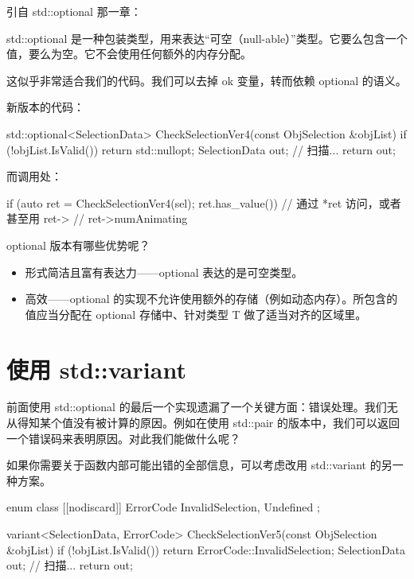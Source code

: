 引自 std::optional 那一章：

std::optional 是一种包装类型，用来表达“可空（null-able）”类型。它要么包含一个值，要么为空。它不会使用任何额外的内存分配。

这似乎非常适合我们的代码。我们可以去掉 ok 变量，转而依赖 optional 的语义。

新版本的代码：

\begin{codebox}[cpp]
std::optional<SelectionData> CheckSelectionVer4(const ObjSelection &objList)
{
    if (!objList.IsValid())
        return std::nullopt;
    SelectionData out;
    // 扫描...
    return out;
}
\end{codebox}

而调用处：

\begin{codebox}[cpp]
if (auto ret = CheckSelectionVer4(sel); ret.has_value())
{
    // 通过 *ret 访问，或者甚至用 ret->
    // ret->numAnimating
}
\end{codebox}

optional 版本有哪些优势呢？

\begin{itemize}
\item 形式简洁且富有表达力——optional 表达的是可空类型。
\item 高效——optional 的实现不允许使用额外的存储（例如动态内存）。所包含的值应当分配在 optional 存储中、针对类型 T 做了适当对齐的区域里。
\end{itemize}

\section{使用 std::variant}

前面使用 std::optional 的最后一个实现遗漏了一个关键方面：错误处理。我们无从得知某个值没有被计算的原因。例如在使用 std::pair 的版本中，我们可以返回一个错误码来表明原因。对此我们能做什么呢？

如果你需要关于函数内部可能出错的全部信息，可以考虑改用 std::variant 的另一种方案。

\begin{codebox}[cpp]
enum class [[nodiscard]] ErrorCode
{
    InvalidSelection,
    Undefined
};

variant<SelectionData, ErrorCode> CheckSelectionVer5(const ObjSelection &objList)
{
    if (!objList.IsValid())
        return ErrorCode::InvalidSelection;
    SelectionData out;
    // 扫描...
    return out;
}
\end{codebox}

